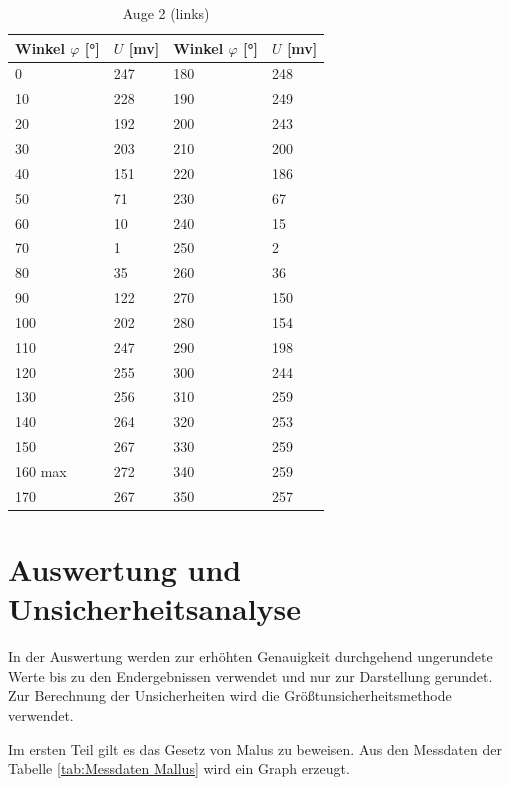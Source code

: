 \documentclass[12pt,a4paper,twoside]{article}
\begin{document}
\begin{table}[H]
    \centering
    \caption{Auge 2 (links)}
    \label{tab:Messdaten Auge links}
    \begin{tabular}{| l | l | l | l |}
        \hline
        Winkel $\varphi$ [°] & $U$ [mv] & Winkel $\varphi$ [°] & $U$ [mv] \\
        \hline
        0    & 247  & 180   & 248  \\
        10   & 228  & 190   & 249  \\
        20   & 192  & 200   & 243  \\
        30   & 203  & 210   & 200  \\
        40   & 151  & 220   & 186  \\
        50   & 71   & 230   & 67   \\
        60   & 10   & 240   & 15   \\
        70   & 1    & 250   & 2    \\
        80   & 35   & 260   & 36   \\
        90   & 122  & 270   & 150  \\
        100  & 202  & 280   & 154  \\
        110  & 247  & 290   & 198  \\
        120  & 255  & 300   & 244  \\
        130  & 256  & 310   & 259  \\
        140  & 264  & 320   & 253  \\
        150  & 267  & 330   & 259  \\
        160 max & 272  & 340   & 259  \\
        170  & 267  & 350   & 257  \\
        \hline
    \end{tabular}
\end{table}


\section{Auswertung und Unsicherheitsanalyse} %
In der Auswertung werden zur erhöhten Genauigkeit durchgehend ungerundete Werte bis zu den Endergebnissen verwendet und nur zur Darstellung gerundet. \\
Zur Berechnung der Unsicherheiten wird die Größtunsicherheitsmethode verwendet.

Im ersten Teil gilt es das Gesetz von Malus zu beweisen. 
Aus den Messdaten der Tabelle \ref{tab:Messdaten Mallus} wird ein Graph erzeugt. 
\end{document}
